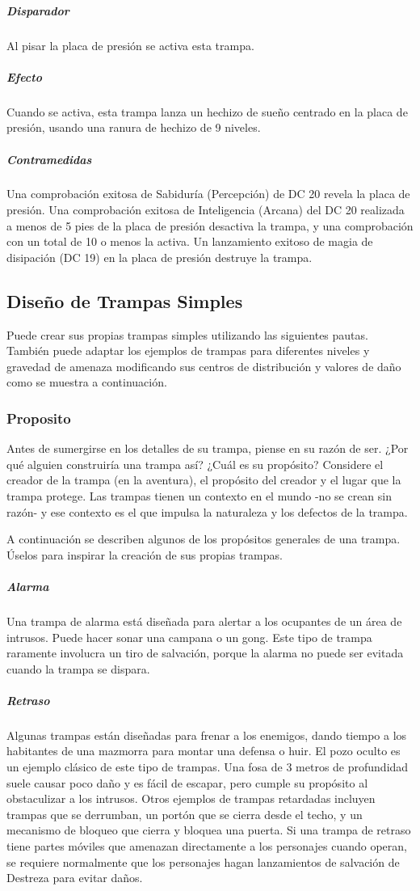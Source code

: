 \documentclass[a4paper,twocolumn,openany,10pt]{dndbook}
\begin{document}
\subparagraph{Disparador} Al pisar la placa de presión se activa esta trampa.

\subparagraph{Efecto} Cuando se activa, esta trampa lanza un hechizo de sueño centrado en la placa de presión, usando una ranura
de hechizo de 9 niveles.

\subparagraph{Contramedidas} Una comprobación exitosa de Sabiduría (Percepción) de DC 20 revela la placa de presión. Una
comprobación exitosa de Inteligencia (Arcana) del DC 20 realizada a menos de 5 pies de la placa de presión desactiva la trampa,
y una comprobación con un total de 10 o menos la activa. Un lanzamiento exitoso de magia de disipación (DC 19) en la placa de
presión destruye la trampa. 

\subsection{Diseño de Trampas Simples}
Puede crear sus propias trampas simples utilizando las siguientes pautas. También puede adaptar los ejemplos de trampas para
diferentes niveles y gravedad de amenaza modificando sus centros de distribución y valores de daño como se muestra a
continuación.

\subsubsection*{Proposito}
Antes de sumergirse en los detalles de su trampa, piense en su razón de ser. ¿Por qué alguien construiría una trampa así? ¿Cuál
es su propósito? Considere el creador de la trampa (en la aventura), el propósito del creador y el lugar que la trampa protege.
Las trampas tienen un contexto en el mundo -no se crean sin razón- y ese contexto es el que impulsa la naturaleza y los defectos
de la trampa.

A continuación se describen algunos de los propósitos generales de una trampa. Úselos para inspirar la creación de sus propias
trampas.

\subparagraph{Alarma} Una trampa de alarma está diseñada para alertar a los ocupantes de un área de intrusos. Puede hacer sonar
una campana o un gong. Este tipo de trampa raramente involucra un tiro de salvación, porque la alarma no puede ser evitada cuando
la trampa se dispara. 

\subparagraph{Retraso} Algunas trampas están diseñadas para frenar a los enemigos, dando tiempo a los habitantes de una mazmorra
para montar una defensa o huir. El pozo oculto es un ejemplo clásico de este tipo de trampas. Una fosa de 3 metros de profundidad
suele causar poco daño y es fácil de escapar, pero cumple su propósito al obstaculizar a los intrusos. Otros ejemplos de trampas
retardadas incluyen trampas que se derrumban, un portón que se cierra desde el techo, y un mecanismo de bloqueo que cierra y
bloquea una puerta. Si una trampa de retraso tiene partes móviles que amenazan directamente a los personajes cuando operan, se
requiere normalmente que los personajes hagan lanzamientos de salvación de Destreza para evitar daños.
\end{document}
